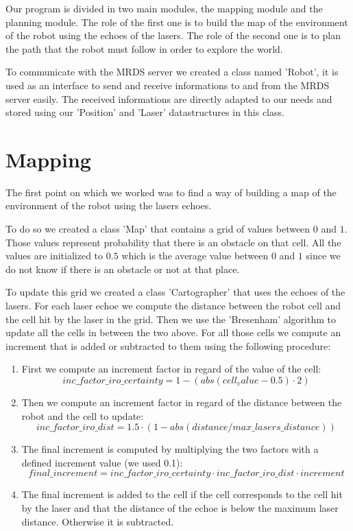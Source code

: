 Our program is divided in two main modules, the mapping module and the planning module.
The role of the first one is to build the map of the environment of the robot using the echoes of the lasers.
The role of the second one is to plan the path that the robot must follow in order to explore the world.

To communicate with the MRDS server we created a class named 'Robot', it is used as an interface to send and receive informations to and from the MRDS server easily.
The received informations are directly adapted to our needs and stored using our 'Position' and 'Laser' datastructures in this class.

\section{Mapping}

The first point on which we worked was to find a way of building a map of the environment of the robot using the lasers echoes.

To do so we created a class 'Map' that contains a grid of values between $0$ and $1$.
Those values represent probability that there is an obstacle on that cell.
All the values are initialized to $0.5$ which is the average value between $0$ and $1$ since we do not know if there is an obstacle or not at that place.

To update this grid we created a class 'Cartographer' that uses the echoes of the lasers.
For each laser echoe we compute the distance between the robot cell and the cell hit by the laser in the grid.
Then we use the 'Bresenham' algorithm to update all the cells in between the two above.
For all those cells we compute an increment that is added or subtracted to them using the following procedure:

\begin{enumerate}
    \item First we compute an increment factor in regard of the value of the cell:
        $$
        inc\_factor\_iro\_certainty = 1 - (abs(cell_value - 0.5) \cdot 2)
        $$
    \item Then we compute an increment factor in regard of the distance between the robot and the cell to update:
        $$
        inc\_factor\_iro\_dist = 1.5 \cdot (1 - abs(distance / max\_lasers\_distance))
        $$
    \item The final increment is computed by multiplying the two factors with a defined increment value (we used 0.1):
        $$
        final\_increment = inc\_factor\_iro\_certainty \cdot inc\_factor\_iro\_dist \cdot increment
        $$
    \item The final increment is added to the cell if the cell corresponds to the cell hit by the laser and that the distance of the echoe is below the maximum laser distance.
        Otherwise it is subtracted.
\end{enumerate}

